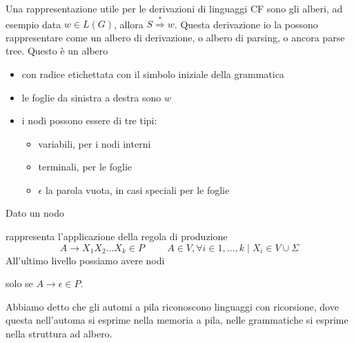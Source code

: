 \documentclass[12pt]{report}
\begin{document}
Una rappresentazione utile per le derivazioni di linguaggi CF sono gli alberi, ad esempio data $w \in L(G)$, allora $S \overset{*}{\Rightarrow} w$.
Questa derivazione io la possono rappresentare come un albero di derivazione, o albero di parsing, o ancora parse tree.
Questo è un albero 
\begin{itemize}
	\item con radice etichettata con il simbolo iniziale della grammatica
	\item le foglie da sinistra a destra sono $w$
	\item i nodi possono essere di tre tipi:
		\begin{itemize}
			\item variabili, per i nodi interni
			\item terminali, per le foglie
			\item $\epsilon$ la parola vuota, in casi speciali per le foglie
		\end{itemize}
\end{itemize}
Dato un nodo
\begin{center}
\end{center}
rappresenta l'applicazione della regola di produzione
$$ A \rightarrow X_1 X_2 \dots X_k \in P \hspace{1cm} A \in V, \forall i \in 1, \dots, k \mid X_i \in V \cup \Sigma $$
All'ultimo livello possiamo avere nodi
\begin{center}
\end{center}
solo se $A \rightarrow \epsilon \in P$.

Abbiamo detto che gli automi a pila riconoscono linguaggi con ricorsione, dove questa nell'automa si esprime nella memoria a pila, nelle grammatiche si esprime nella struttura ad albero.
 
\end{document}
